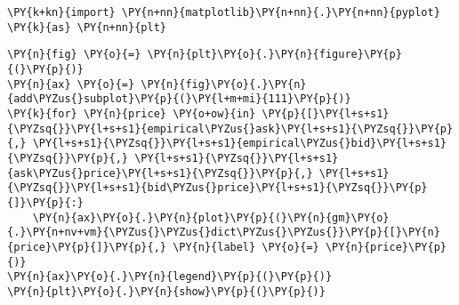 \documentclass[9pt]{article}
\begin{document}
    \begin{tcolorbox}[breakable, size=fbox, boxrule=1pt, pad at break*=1mm,colback=cellbackground, colframe=cellborder]
\begin{Verbatim}[commandchars=\\\{\}]
\PY{k+kn}{import} \PY{n+nn}{matplotlib}\PY{n+nn}{.}\PY{n+nn}{pyplot} \PY{k}{as} \PY{n+nn}{plt}
\end{Verbatim}
\end{tcolorbox}

    \begin{tcolorbox}[breakable, size=fbox, boxrule=1pt, pad at break*=1mm,colback=cellbackground, colframe=cellborder]
\begin{Verbatim}[commandchars=\\\{\}]
\PY{n}{fig} \PY{o}{=} \PY{n}{plt}\PY{o}{.}\PY{n}{figure}\PY{p}{(}\PY{p}{)}
\PY{n}{ax} \PY{o}{=} \PY{n}{fig}\PY{o}{.}\PY{n}{add\PYZus{}subplot}\PY{p}{(}\PY{l+m+mi}{111}\PY{p}{)}
\PY{k}{for} \PY{n}{price} \PY{o+ow}{in} \PY{p}{[}\PY{l+s+s1}{\PYZsq{}}\PY{l+s+s1}{empirical\PYZus{}ask}\PY{l+s+s1}{\PYZsq{}}\PY{p}{,} \PY{l+s+s1}{\PYZsq{}}\PY{l+s+s1}{empirical\PYZus{}bid}\PY{l+s+s1}{\PYZsq{}}\PY{p}{,} \PY{l+s+s1}{\PYZsq{}}\PY{l+s+s1}{ask\PYZus{}price}\PY{l+s+s1}{\PYZsq{}}\PY{p}{,} \PY{l+s+s1}{\PYZsq{}}\PY{l+s+s1}{bid\PYZus{}price}\PY{l+s+s1}{\PYZsq{}}\PY{p}{]}\PY{p}{:}
    \PY{n}{ax}\PY{o}{.}\PY{n}{plot}\PY{p}{(}\PY{n}{gm}\PY{o}{.}\PY{n+nv+vm}{\PYZus{}\PYZus{}dict\PYZus{}\PYZus{}}\PY{p}{[}\PY{n}{price}\PY{p}{]}\PY{p}{,} \PY{n}{label} \PY{o}{=} \PY{n}{price}\PY{p}{)}
\PY{n}{ax}\PY{o}{.}\PY{n}{legend}\PY{p}{(}\PY{p}{)}
\PY{n}{plt}\PY{o}{.}\PY{n}{show}\PY{p}{(}\PY{p}{)}
\end{Verbatim}
\end{tcolorbox}

    \begin{center}
    \end{center}
    { \hspace*{\fill} \\}
    
\end{document}
